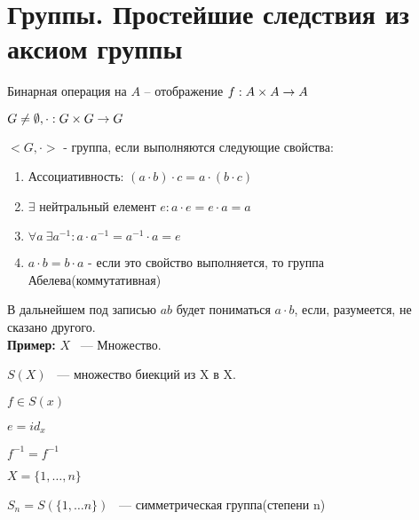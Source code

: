 \section{Группы. Простейшие следствия из аксиом группы}
\begin{Def}
	Бинарная операция на $A$ -- отображение $f : A \times A \rightarrow A$
\end{Def}
$G \neq \emptyset, \cdot : G \times G \rightarrow G$

$<G, \cdot > $ - группа, если выполняются следующие свойства:
\begin{enumerate}
	\item Ассоциативность: $(a \cdot b) \cdot c = a \cdot (b \cdot c)$		
	\item $\exists$ нейтральный елемент $e : a \cdot e = e \cdot a = a$
	\item $\forall a \: \exists a^{-1} : a \cdot a^{-1} = a^{-1} \cdot a = e$		
	\item $a \cdot b = b \cdot a$ - если это свойство выполняется, то группа Абелева(коммутативная) 
\end{enumerate}

В дальнейшем под записью $ab$ будет пониматься $a \cdot b$, если, разумеется, не сказано другого.     \\

{\bf Пример:} 
$X$ ~--- Множество.

$S(X)$ ~--- множество биекций из X в X.

$f \in S(x)$

$e = id_x$

$f^{-1} =f^{-1}$

$X = \{1, \ldots, n\}$

$S_n = S(\{1, \ldots n\})$ ~--- симметрическая группа(степени n)
	

